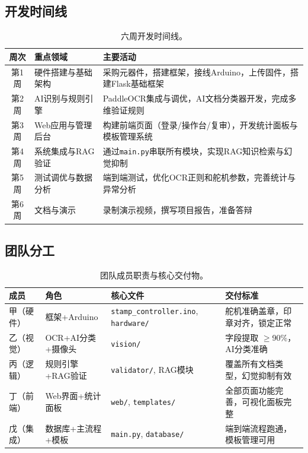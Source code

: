 \documentclass[conference]{IEEEtran}
\begin{document}
\subsection{开发时间线}

\begin{table}[H]
\centering
\caption{六周开发时间线。}
\label{tab:timeline}
\begin{tabular}{@{}clp{6cm}@{}}
\toprule
\textbf{周次} & \textbf{重点领域} & \textbf{主要活动} \\
\midrule
第1周 & 硬件搭建与基础架构 & 采购元器件，搭建框架，接线Arduino，上传固件，搭建Flask基础框架 \\
第2周 & AI识别与规则引擎 & PaddleOCR集成与调优，AI文档分类器开发，完成多维验证规则 \\
第3周 & Web应用与管理后台 & 构建前端页面（登录/操作台/复审），开发统计面板与模板管理系统 \\
第4周 & 系统集成与RAG验证 & 通过\texttt{main.py}串联所有模块，实现RAG知识检索与幻觉抑制 \\
第5周 & 测试调优与数据分析 & 端到端测试，优化OCR正则和舵机参数，完善统计与异常分析 \\
第6周 & 文档与演示 & 录制演示视频，撰写项目报告，准备答辩 \\
\bottomrule
\end{tabular}
\end{table}

\subsection{团队分工}

\begin{table}[H]
\centering
\caption{团队成员职责与核心交付物。}
\label{tab:team}
\begin{tabular}{@{}llp{3cm}p{3.5cm}@{}}
\toprule
\textbf{成员} & \textbf{角色} & \textbf{核心文件} & \textbf{交付标准} \\
\midrule
甲（硬件） & 框架+Arduino & \texttt{stamp\_controller.ino}, \texttt{hardware/} & 舵机准确盖章，印章对齐，锁定正常 \\
乙（视觉） & OCR+AI分类+摄像头 & \texttt{vision/} & 字段提取 $\geq$90\%，AI分类准确 \\
丙（逻辑） & 规则引擎+RAG验证 & \texttt{validator/}, RAG模块 & 覆盖所有文档类型，幻觉抑制有效 \\
丁（前端） & Web界面+统计面板 & \texttt{web/}, \texttt{templates/} & 全部页面功能完善，可视化面板完整 \\
戊（集成） & 数据库+主流程+模板 & \texttt{main.py}, \texttt{database/} & 端到端流程跑通，模板管理可用 \\
\bottomrule
\end{tabular}
\end{table}
\end{document}

